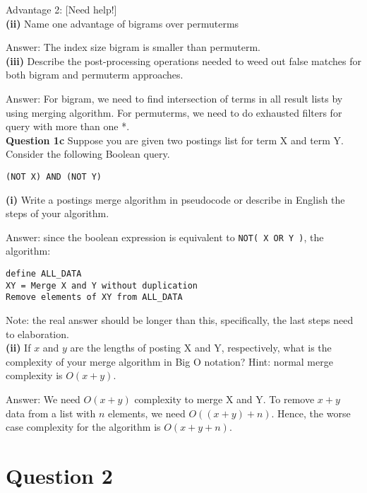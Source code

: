 \documentclass[11pt,a4paper]{report}
\begin{document}
\begin{multicols*}{2}
\noindent Advantage 2: [Need help!]\\

\noindent \textbf{(ii)} Name one advantage of bigrams over permuterms

\noindent Answer: The index size bigram is smaller than permuterm.\\

\noindent \textbf{(iii)} Describe the post-processing operations needed to weed out false matches for both bigram and permuterm approaches. 

\noindent Answer: For bigram, we need to find intersection of terms in all result lists by using merging algorithm. For permuterms, we need to do exhausted filters for query with more than one *.\\

\noindent \textbf{Question 1c} Suppose you are given two postings list for term X and term Y. Consider the following Boolean query.

\begin{center}
\verb|(NOT X) AND (NOT Y)|
\end{center}

\noindent \textbf{(i)} Write a postings merge algorithm in pseudocode or describe in English the steps of your algorithm.

\noindent Answer: since the boolean expression is equivalent to \verb|NOT( X OR Y )|, the algorithm:

\begin{verbatim}
define ALL_DATA
XY = Merge X and Y without duplication
Remove elements of XY from ALL_DATA
\end{verbatim}

\noindent Note: the real answer should be longer than this, specifically, the last steps need to elaboration. \\

\noindent \textbf{(ii)} If $x$ and $y$ are the lengths of posting X and Y, respectively, what is the complexity of your merge algorithm in Big O notation? Hint: normal merge complexity is $O(x+y)$.

\noindent Answer: We need $O(x+y)$ complexity to merge X and Y. To remove $x+y$ data from a list with $n$ elements, we need $O((x+y)+n)$. Hence, the worse case complexity for the algorithm is $O(x+y+n)$.

\section{Question 2}


\end{multicols*}
\end{document}
